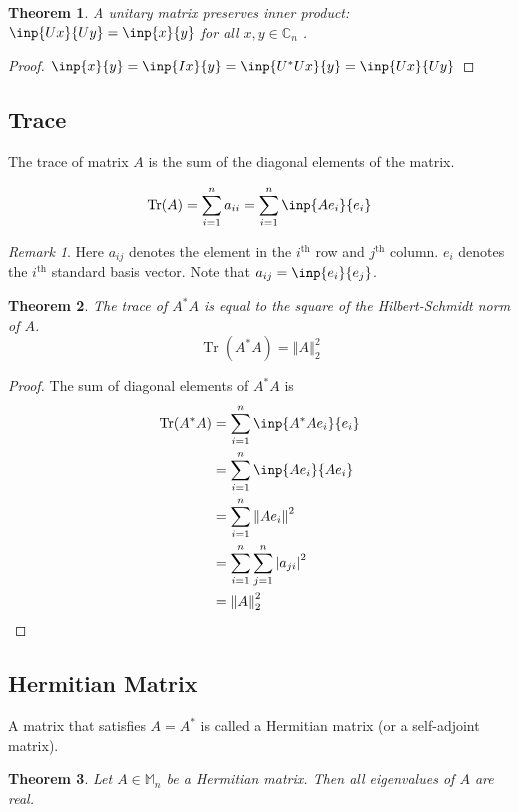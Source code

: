 \documentclass[twofold]{article}
\newcommand*\adj[1]{#1^*}
\newcommand*\norm[1]{\left \Vert #1 \right\Vert}
\newcommand*\abs[1]{\left \vert #1 \right\vert}
\DeclareMathOperator{\Tr}{Tr}
\theoremstyle{plain}
\newtheorem{theorem}{Theorem}
\theoremstyle{definition}
\theoremstyle{remark}
\newtheorem*{remark}{Remark}
\begin{document}
\begin{theorem} A unitary matrix preserves inner product: \(\inp{Ux}{Uy} = \inp{x}{y}\) for all  \(x, y \in \mathbb{C}_n\) . \end{theorem}

\begin{proof} \(\inp{x}{y} = \inp{Ix}{y} = \inp{\adj{U}U x}{y} = \inp{Ux}{Uy}\) \end{proof}

\subsection{Trace}
The trace of matrix \(A\) is the sum of the diagonal elements of the matrix.

\[\Tr(A) = \sum_{i=1} ^n a_{ii} = \sum_{i=1} ^n \inp{Ae_i}{ e_i}\]

\begin{remark}Here \(a_{ij}\) denotes the element in the \(i^{\text{th}}\) row and \(j^{\text{th}}\) column. \(e_i\) denotes the \(i^{\text{th}}\) standard basis vector. Note that \(a_{ij} = \inp{e_i}{e_j}\).\end{remark}

\begin{theorem}The trace of \(\adj{A}A\) is equal to the square of the Hilbert-Schmidt norm of \(A\). \[\Tr( \adj{A} A ) = \norm{A}_2^2\]\end{theorem}
\begin{proof}
The sum of diagonal elements of \(\adj{A} A\) is
 \begin{equation*} \begin{split} 
\Tr(\adj{A} A) & = \sum_{i=1}^n \inp{\adj{A}A e_i}{e_i} \\
& = \sum_{i=1} ^n \inp{Ae_i}{Ae_i} \\
& = \sum_{i=1} ^n \norm{Ae_i}^2 \\
& = \sum_{i=1} ^n \sum_{j=1} ^n \abs{a_{ji}}^2 \\
& = \norm{A}^2_2
\end{split} \end{equation*}
 \end{proof}

\subsection{Hermitian Matrix}
A matrix that satisfies \(A = \adj{A}\) is called a Hermitian matrix (or a self-adjoint matrix). 

\begin{theorem} \label{herm_eig_real} Let \(A \in \mathbb{M}_n\) be a Hermitian matrix. Then all eigenvalues of \(A\) are real. \end{theorem}
\end{document}
